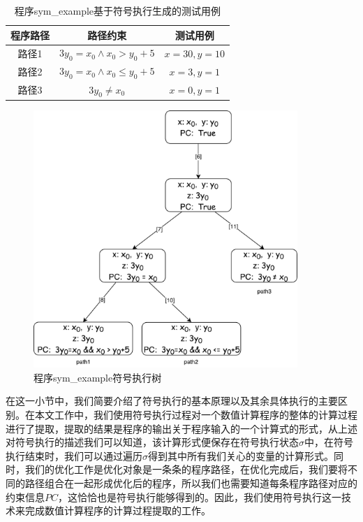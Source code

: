 \begin{table}
    \centering
    \begin{tabular}{ccc}
      \toprule
      \textbf{程序路径} & \textbf{路径约束} & \textbf{测试用例} \\
      \midrule
      路径1 & $3y_0 = x_0 \wedge x_0 > y_0 + 5$ & $x = 30, y = 10 $ \\
      路径2 & $3y_0 = x_0 \wedge x_0 \leq y_0 + 5 $ & $x = 3, y = 1$ \\
      路径3 & $3y_0 \neq x_0$ & $x = 0, y = 1$ \\
      \bottomrule
    \end{tabular}
    \caption{程序sym\_example基于符号执行生成的测试用例}\label{tbl:symexamres}
\end{table}

\begin{figure}[hbp]
    \centering
    \includegraphics[width=100mm]{fig/SymExecTree.pdf}
    \caption{程序sym\_example符号执行树} \label{fig:symexectree}
 \end{figure}





在这一小节中，我们简要介绍了符号执行的基本原理以及其余具体执行的主要区别。在本文工作中，我们使用符号执行过程对一个数值计算程序的整体的计算过程进行了提取，提取的结果是程序的输出关于程序输入的一个计算式的形式，从上述对符号执行的描述我们可以知道，该计算形式便保存在符号执行状态$\sigma$中，在符号执行结束时，我们可以通过遍历$\sigma$得到其中所有我们关心的变量的计算形式。同时，我们的优化工作是优化对象是一条条的程序路径，在优化完成后，我们要将不同的路径组合在一起形成优化后的程序，所以我们也需要知道每条程序路径对应的约束信息$PC$，这恰恰也是符号执行能够得到的。因此，我们使用符号执行这一技术来完成数值计算程序的计算过程提取的工作。
